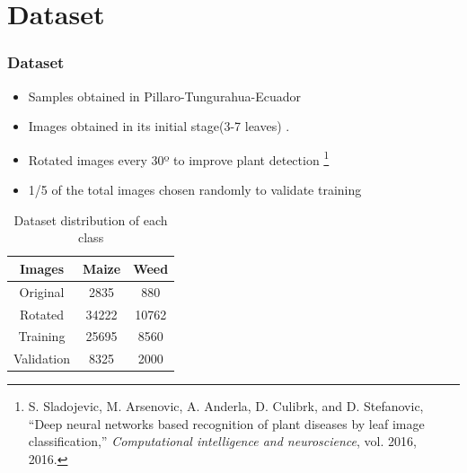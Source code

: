 \documentclass[10pt,a4paper]{beamer}
\begin{document}
\section{Dataset}
\begin{frame}
\frametitle{Dataset}
\begin{itemize}
\item Samples obtained in Pillaro-Tungurahua-Ecuador
\item Images obtained in its initial stage(3-7 leaves) . %
\item Rotated images every 30º to improve plant detection \footnote{ S. Sladojevic, M. Arsenovic, A. Anderla, D. Culibrk, and D. Stefanovic, “Deep neural networks based recognition of plant diseases by leaf image classification,” \textit{Computational intelligence and neuroscience}, vol. 2016, 2016.
}%
\item 1/5 of the total images chosen randomly to validate training%
\end{itemize}
\begin{table}[h!]
\renewcommand{\arraystretch}{1.3}
\caption{Dataset distribution of each class}
\label{table:1}
\centering
\begin{tabular}{| c c c |} 
 \hline
 \textbf{Images} & \textbf{Maize} & \textbf{Weed}  \\ [1ex] 
 \hline
 Original  & 2835 & 880 \\ 
 Rotated & 34222 & 10762 \\ 
 Training & 25695 & 8560 \\
 Validation & 8325 & 2000 \\
 \hline
\end{tabular}
\end{table}
\end{frame}
\end{document}
